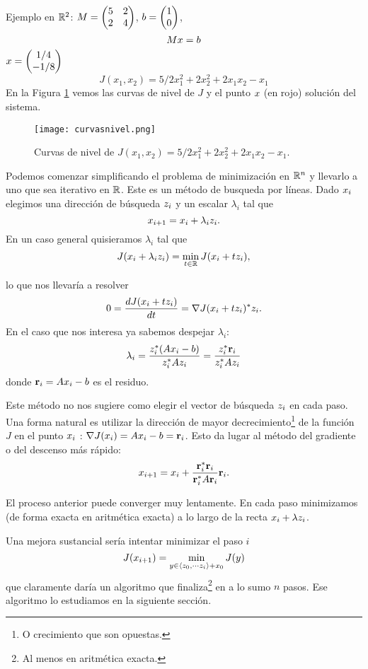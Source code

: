 Ejemplo en $\mathbb R^2$: $
\Mb=\begin{pmatrix}
     5&2\\
     2&4
    \end{pmatrix}
$, $
\bb=\begin{pmatrix}
     1\\
     0
    \end{pmatrix}
$,
$$
\Mb\xb=\bb
$$
$\xb=\begin{pmatrix}
    1/4\\
    -1/8
     \end{pmatrix}
$
$$
J(x_1,x_2)=5/2x_1^2+2x_2^2+2x_1x_2-x_1
$$
En la Figura \ref{fig:curvasdeJ} vemos las curvas de nivel de $J$ y el punto $\xb$ (en rojo) solución del sistema. 


\begin{figure}[h]
\centering\texttt{[image: curvasnivel.png]}
\label{fig:curvasdeJ}
\caption{Curvas de nivel de $
J(x_1,x_2)=5/2x_1^2+2x_2^2+2x_1x_2-x_1
$.}
\end{figure}

Podemos comenzar simplificando el problema de minimización en $\mathbb R^n$ y llevarlo a uno que sea iterativo en $\mathbb R$. Este es un m\'etodo de busqueda por líneas. Dado $\xb_i$ elegimos una dirección de búsqueda $\zb_i$ y un escalar $\lambda_i$ tal que
$$
\xb_{i+1}=\xb_i+\lambda_i\zb_i.
$$
En un caso general quisieramos $\lambda_i$ tal que
$$
J(\xb_{i}+\lambda_i\zb_i )=\min_{t\in \R}J(\xb_i+t\zb_i),
$$

lo que nos llevaría a resolver
$$
0=\frac{dJ(\xb_{i}+t\zb_i )}{dt}=\nabla J(\xb_{i}+t\zb_i )^*\zb_i.
$$
En el caso que nos interesa ya sabemos despejar $\lambda_i$:
$$
\lambda_i=\frac{\zb_i^*(\Ab\xb_i-\bb)}{\zb_i^*\Ab\zb_i}=
\frac{\zb_i^*\rb_i}{\zb_i^*\Ab\zb_i}
$$
donde $\rb_i=\Ab\xb_i-\bb$ es el residuo.

Este método no nos sugiere como elegir el vector de búsqueda $\zb_i$ en cada paso. Una forma natural es utilizar la dirección de mayor decrecimiento\footnote{O crecimiento que son opuestas.} de la función $J$ en el punto $\xb_i$ : $\nabla J(\xb_i)=\Ab\xb_i-\bb=\rb_i$. Esto da lugar al método del gradiente o del descenso más rápido:
$$
\xb_{i+1}=\xb_i+\frac{\rb_i^*\rb_i}{\rb_i^*\Ab\rb_i}
\rb_i.
$$


El proceso anterior puede converger muy lentamente. 
En cada paso minimizamos (de forma exacta en aritmética exacta) a lo largo de la recta $\xb_i+\lambda \zb_i$.

Una mejora sustancial sería intentar minimizar el paso $i$ $$
J(\xb_{i+1})=\min_{\yb\in \langle \zb_0,\cdots\zb_i \rangle + x_0}J(\yb)
$$
que claramente daría un algoritmo que finaliza\footnote{Al menos en aritmética exacta.} en a lo sumo $n$ pasos. Ese algoritmo lo estudiamos en la siguiente sección.
